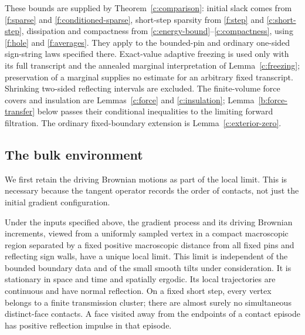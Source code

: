 These bounds are supplied by Theorem~\ref{c:comparison}: initial slack
comes from \ref{f:sparse} and \ref{f:conditioned-sparse}, short-step
sparsity from \ref{f:step} and \eqref{c:short-step}, dissipation and
compactness from \eqref{c:energy-bound}--\eqref{c:compactness}, using
\ref{f:hole} and \ref{f:averages}. They apply to the bounded-pin and
ordinary one-sided sign-string laws specified there. Exact-value
adaptive freezing is used only with its full transcript and the
annealed marginal interpretation of Lemma~\ref{c:freezing}; preservation
of a marginal supplies no estimate for an arbitrary fixed transcript.
Shrinking two-sided reflecting intervals are excluded. The finite-volume
force covers and insulation are Lemmas~\ref{c:force} and
\ref{c:insulation}; Lemma~\ref{b:force-transfer} below passes their
conditional inequalities to the limiting forward filtration. The
ordinary fixed-boundary extension is Lemma~\ref{c:exterior-zero}.

\subsection{The bulk environment}

We first retain the driving Brownian motions as part of the local limit.
This is necessary because the tangent operator records the order of
contacts, not just the initial gradient configuration.

\begin{proposition}\label{b:bulk}
Under the inputs specified above, the gradient process and its driving
Brownian increments, viewed from a uniformly sampled vertex in a compact
macroscopic region separated by a fixed positive macroscopic distance
from all fixed pins and reflecting sign walls, have a unique local limit. This limit is
independent of the bounded boundary data and of the small smooth tilts under
consideration. It is stationary in space and time and spatially ergodic.
Its local trajectories are continuous and have normal reflection. On a
fixed short step, every vertex belongs to a finite transmission cluster;
there are almost surely no simultaneous distinct-face contacts. A face
visited away from the endpoints of a contact episode has positive
reflection impulse in that episode.
\end{proposition}

